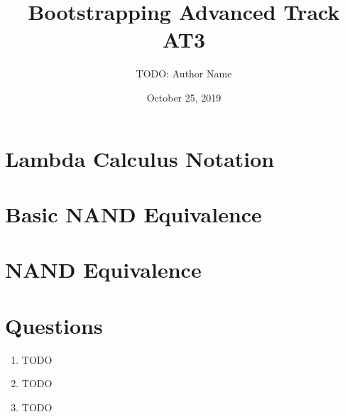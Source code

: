 \documentclass[12pt]{article}
\begin{document}
\title{Bootstrapping Advanced Track AT3}
\author{TODO: Author Name}
\date{October 25, 2019}

\maketitle


\section{Lambda Calculus Notation}




\section{Basic NAND Equivalence}




\section{NAND Equivalence}




\section*{Questions}


\begin{enumerate}
  \item TODO

  \item TODO

  \item TODO


\end{enumerate}
\end{document}
